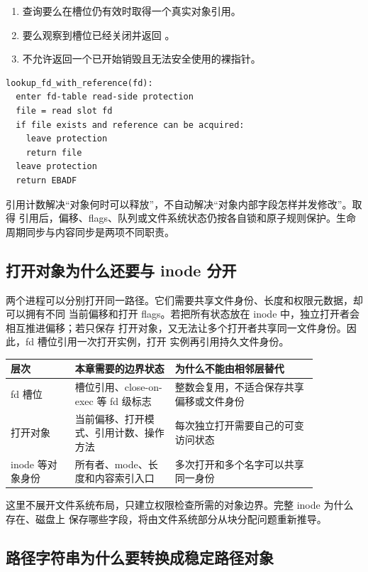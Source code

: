 \begin{enumerate}
\tightlist
\item 查询要么在槽位仍有效时取得一个真实对象引用。
\item 要么观察到槽位已经关闭并返回 。
\item 不允许返回一个已开始销毁且无法安全使用的裸指针。
\end{enumerate}

\begin{lstlisting}
lookup_fd_with_reference(fd):
  enter fd-table read-side protection
  file = read slot fd
  if file exists and reference can be acquired:
    leave protection
    return file
  leave protection
  return EBADF
\end{lstlisting}

引用计数解决“对象何时可以释放”，不自动解决“对象内部字段怎样并发修改”。取得
 引用后，偏移、flags、队列或文件系统状态仍按各自锁和原子规则保护。生命
周期同步与内容同步是两项不同职责。

\subsection{打开对象为什么还要与 inode 分开}

两个进程可以分别打开同一路径。它们需要共享文件身份、长度和权限元数据，却可以拥有不同
当前偏移和打开 flags。若把所有状态放在 inode 中，独立打开者会相互推进偏移；若只保存
打开对象，又无法让多个打开者共享同一文件身份。因此，fd 槽位引用一次打开实例，打开
实例再引用持久文件身份。

\begin{longtable}{|L{0.18\linewidth}|L{0.28\linewidth}|L{0.40\linewidth}|}
\hline
层次 & 本章需要的边界状态 & 为什么不能由相邻层替代 \\ \hline
fd 槽位 & 槽位引用、close-on-exec 等 fd 级标志 & 整数会复用，不适合保存共享偏移或文件身份 \\ \hline
打开对象 & 当前偏移、打开模式、引用计数、操作方法 & 每次独立打开需要自己的可变访问状态 \\ \hline
inode 等对象身份 & 所有者、mode、长度和内容索引入口 & 多次打开和多个名字可以共享同一身份 \\ \hline
\end{longtable}

这里不展开文件系统布局，只建立权限检查所需的对象边界。完整 inode 为什么存在、磁盘上
保存哪些字段，将由文件系统部分从块分配问题重新推导。

\subsection{路径字符串为什么要转换成稳定路径对象}


